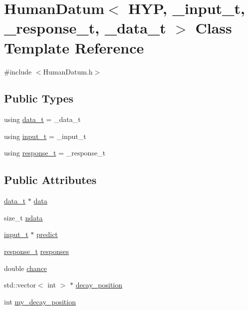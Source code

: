 \hypertarget{struct_human_datum}{}\section{Human\+Datum$<$ H\+YP, \+\_\+input\+\_\+t, \+\_\+response\+\_\+t, \+\_\+data\+\_\+t $>$ Class Template Reference}
\label{struct_human_datum}


{\ttfamily \#include $<$Human\+Datum.\+h$>$}

\subsection*{Public Types}
\begin{DoxyCompactItemize}
\item 
using \hyperlink{struct_human_datum_ab199049ab924515f05cf207d380bb851}{data\+\_\+t} = \+\_\+data\+\_\+t
\item 
using \hyperlink{struct_human_datum_a8229662f54f4b18d33b0d068d23b03b0}{input\+\_\+t} = \+\_\+input\+\_\+t
\item 
using \hyperlink{struct_human_datum_a372a0b9a919bc58aae2fa4de57dd9221}{response\+\_\+t} = \+\_\+response\+\_\+t
\end{DoxyCompactItemize}
\subsection*{Public Attributes}
\begin{DoxyCompactItemize}
\item 
\hyperlink{struct_human_datum_ab199049ab924515f05cf207d380bb851}{data\+\_\+t} $\ast$ \hyperlink{struct_human_datum_a0b071376a3ff5baf723017393149182d}{data}
\item 
size\+\_\+t \hyperlink{struct_human_datum_a4cabbec51db8dae4e680be03e135a22a}{ndata}
\item 
\hyperlink{struct_human_datum_a8229662f54f4b18d33b0d068d23b03b0}{input\+\_\+t} $\ast$ \hyperlink{struct_human_datum_a181f72457631b0923c54993defe55226}{predict}
\item 
\hyperlink{struct_human_datum_a372a0b9a919bc58aae2fa4de57dd9221}{response\+\_\+t} \hyperlink{struct_human_datum_aac9863d06981207645ce7acf1bb7c8c9}{responses}
\item 
double \hyperlink{struct_human_datum_aca8d9329fdb039825106735fff8b653d}{chance}
\item 
std\+::vector$<$ int $>$ $\ast$ \hyperlink{struct_human_datum_a34b8290e9ec504669cd18bad96419e83}{decay\+\_\+position}
\item 
int \hyperlink{struct_human_datum_af3825f4fb10987c0dd68063ba3613069}{my\+\_\+decay\+\_\+position}
\end{DoxyCompactItemize}


